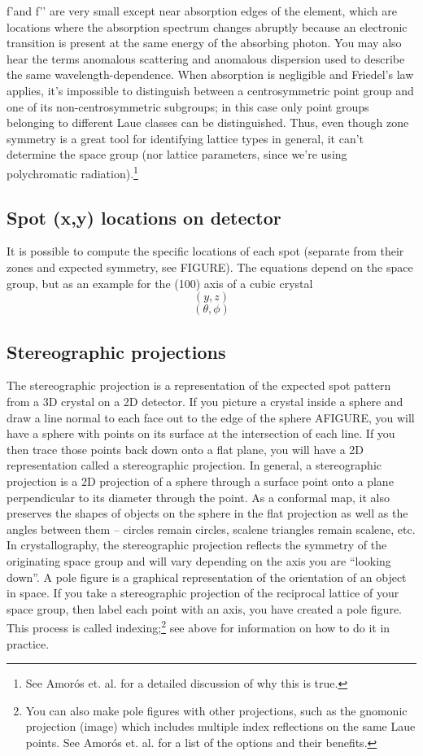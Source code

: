 f'and f’’ are very small except near absorption edges of the element, which are locations where the absorption spectrum changes abruptly because an electronic transition is present at the same energy of the absorbing photon. You may also hear the terms anomalous scattering and anomalous dispersion used to describe the same wavelength-dependence.
When absorption is negligible and Friedel's law applies, it’s impossible to distinguish between a centrosymmetric point group and one of its non-centrosymmetric subgroups; in this case only point groups belonging to different Laue classes can be distinguished. Thus, even though zone symmetry is a great tool for identifying lattice types in general, it can’t determine the space group (nor lattice parameters, since we’re using polychromatic radiation).\footnote{See Amorós et. al. for a detailed discussion of why this is true.}
\subsection{Spot (x,y) locations on detector}
It is possible to compute the specific locations of each spot (separate from their zones and expected symmetry, see FIGURE). The equations depend on the space group, but as an example for the (100) axis of a cubic crystal 
\begin{equation}
    (y,z)
    \label{CubicSpotYZ}
\end{equation}
\begin{equation}
    (\theta,\phi)
    \label{CubicSpotAng}
\end{equation}
\subsection{Stereographic projections}
The stereographic projection is a representation of the expected spot pattern from a 3D crystal on a 2D detector. If you picture a crystal inside a sphere and draw a line normal to each face out to the edge of the sphere AFIGURE, you will have a sphere with points on its surface at the intersection of each line. If you then trace those points back down onto a flat plane, you will have a 2D representation called a stereographic projection. In general, a stereographic projection is a 2D projection of a sphere through a surface point onto a plane perpendicular to its diameter through the point. As a conformal map, it also preserves the shapes of objects on the sphere in the flat projection as well as the angles between them – circles remain circles, scalene triangles remain scalene, etc. In crystallography, the stereographic projection reflects the symmetry of the originating space group and will vary depending on the axis you are “looking down”.
A pole figure is a graphical representation of the orientation of an object in space. If you take a stereographic projection of the reciprocal lattice of your space group, then label each point with an axis, you have created a pole figure. This process is called indexing;\footnote{You can also make pole figures with other projections, such as the gnomonic projection (image) which includes multiple index reflections on the same Laue points. See Amorós et. al. for a list of the options and their benefits.} see above for information on how to do it in practice.